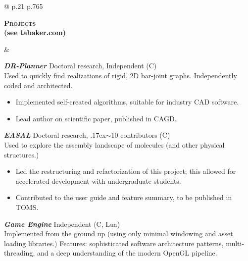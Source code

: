 \documentclass[10pt]{article}
\def\mytilde{{\raise.17ex\hbox{$\scriptstyle\mathtt{\sim}$}}}
\def\cpp{{C\nolinebreak[4]\hspace{-.05em}\raisebox{.4ex}{\tiny\bf ++}}}
\newcommand{\titlecell}[1]{%
    \begin{minipage}[t]{\linewidth}
        \raggedleft \textbf{#1}
    \end{minipage}}
\newcommand{\contentcell}[1]{%
    \begin{minipage}[t]{\linewidth}
        #1
    \end{minipage}}
\newcommand{\projectskip}{\vspace{3.32mm}}
\newcommand{\contentcellheader}[1]{\textbf{\textsl{#1}}}
\begin{document}
\begin{tabular}{@{} p{.21\textwidth} p{.765\textwidth}}
    \titlecell{\textsc{Projects} \\ (see tabaker.com)} &
    \contentcell{
        \contentcellheader{DR-Planner} \hfill Doctoral research, Independent (\cpp)
        \\ Used to quickly find realizations of rigid, 2D bar-joint graphs. Independently coded and architected.
        \begin{itemize}[itemsep=0pt,topsep=0pt] \itemsep -2pt
            \item Implemented self-created algorithms, suitable for industry CAD software.
            \item Lead author on scientific paper, published in CAGD.
        \end{itemize}
        \projectskip

        \contentcellheader{EASAL} \hfill Doctoral research, \mytilde 10 contributors (\cpp)
        \\ Used to explore the assembly landscape of molecules (and other physical structures.)
        \begin{itemize}[itemsep=0pt,topsep=0pt] \itemsep -2pt
            \item Led the restructuring and refactorization of this project; this allowed for accelerated development with undergraduate students.
            \item Contributed to the user guide and feature summary, to be published in TOMS.
        \end{itemize}
        \projectskip

        \contentcellheader{Game Engine} \hfill Independent (\cpp, Lua)
        \\ Implemented from the ground up (using only minimal windowing and asset loading libraries.) Features: sophisticated software architecture patterns, multi-threading, and a deep understanding of the modern OpenGL
        pipeline.
        \projectskip

}
\end{tabular}
\end{document}
